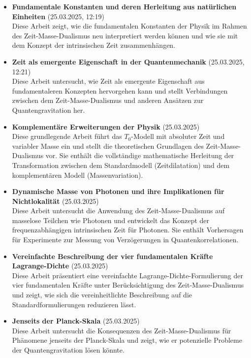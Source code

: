 \documentclass{article}
\begin{document}
\vspace{1.5 cm}	
	\begin{itemize}[leftmargin=*]
		\item \textbf{Fundamentale Konstanten und deren Herleitung aus natürlichen Einheiten} (25.03.2025, 12:19)\\
		Diese Arbeit zeigt, wie die fundamentalen Konstanten der Physik im Rahmen des Zeit-Masse-Dualismus neu interpretiert werden können und wie sie mit dem Konzept der intrinsischen Zeit zusammenhängen.
		
		\item \textbf{Zeit als emergente Eigenschaft in der Quantenmechanik} (25.03.2025, 12:21)\\
		Diese Arbeit untersucht, wie Zeit als emergente Eigenschaft aus fundamentaleren Konzepten hervorgehen kann und stellt Verbindungen zwischen dem Zeit-Masse-Dualismus und anderen Ansätzen zur Quantengravitation her.
				
		\item \textbf{Komplementäre Erweiterungen der Physik} (25.03.2025)\\
		Diese grundlegende Arbeit führt das $T_0$-Modell mit absoluter Zeit und variabler Masse ein und stellt die theoretischen Grundlagen des Zeit-Masse-Dualismus vor. Sie enthält die vollständige mathematische Herleitung der Transformation zwischen dem Standardmodell (Zeitdilatation) und dem komplementären Modell (Massenvariation).
		
		\item \textbf{Dynamische Masse von Photonen und ihre Implikationen für Nichtlokalität} (25.03.2025)\\
		Diese Arbeit untersucht die Anwendung des Zeit-Masse-Dualismus auf masselose Teilchen wie Photonen und entwickelt das Konzept der frequenzabhängigen intrinsischen Zeit für Photonen. Sie enthält Vorhersagen für Experimente zur Messung von Verzögerungen in Quantenkorrelationen.
		
				
		\item \textbf{Vereinfachte Beschreibung der vier fundamentalen Kräfte Lagrange-Dichte} (25.03.2025)\\
		Diese Arbeit präsentiert eine vereinfachte Lagrange-Dichte-Formulierung der vier fundamentalen Kräfte unter Berücksichtigung des Zeit-Masse-Dualismus und zeigt, wie sich die vereinheitlichte Beschreibung auf die Standardformulierungen reduzieren lässt.
		
		\item \textbf{Jenseits der Planck-Skala} (25.03.2025)\\
		Diese Arbeit untersucht die Konsequenzen des Zeit-Masse-Dualismus für Phänomene jenseits der Planck-Skala und zeigt, wie er potenzielle Probleme der Quantengravitation lösen könnte.


	\end{itemize}
	

	
	
	
\end{document}
